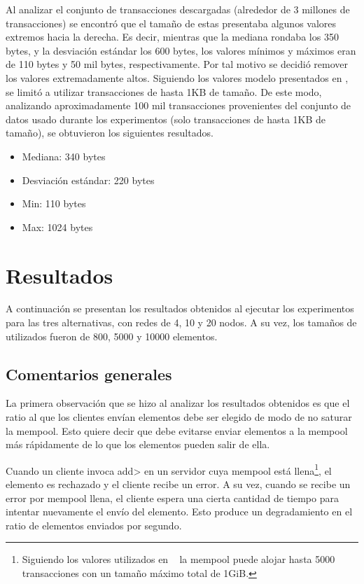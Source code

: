%
Al analizar el conjunto de transacciones descargadas (alrededor de 3 millones de transacciones) se encontró que el tamaño de
estas presentaba algunos valores extremos hacia la derecha.
Es decir, mientras que la mediana rondaba los 350 bytes, y la desviación estándar los 600 bytes, los valores mínimos y máximos eran de
110 bytes y  50 mil bytes, respectivamente.
Por tal motivo se decidió remover los valores extremadamente altos.
Siguiendo los valores modelo presentados en \cite{tendermint.design}, se limitó a utilizar transacciones de hasta 1KB de tamaño.
De este modo, analizando aproximadamente 100 mil transacciones provenientes del conjunto de datos usado
durante los experimentos (solo transacciones de hasta 1KB de tamaño), se obtuvieron los siguientes resultados.
\begin{itemize}
	\item Mediana: 340 bytes
	\item Desviación estándar: 220 bytes
	\item Min: 110 bytes
	\item Max: 1024 bytes
\end{itemize}

\section{Resultados}

A continuación se presentan los resultados obtenidos al ejecutar los experimentos para las tres alternativas,
con redes de 4, 10 y 20 nodos. A su vez, los tamaños de \collector utilizados fueron de
800, 5000 y 10000 elementos.

\subsection{Comentarios generales}

La primera observación que se hizo al analizar los resultados obtenidos es que el ratio al que los clientes envían elementos
debe ser elegido de modo de no saturar la mempool.
Esto quiere decir que debe evitarse enviar elementos a la mempool más rápidamente de lo que los elementos pueden salir de ella.

Cuando un cliente invoca \<add> en un servidor cuya mempool está llena\footnote{Siguiendo los valores utilizados en
~\cite{tendermint.design} la mempool puede alojar hasta 5000 transacciones con un tamaño máximo total de 1GiB.},
el elemento es rechazado y el cliente recibe un error.
A su vez, cuando se recibe un error por mempool llena, el cliente espera una cierta cantidad de tiempo para intentar
nuevamente el envío del elemento.
Esto produce un degradamiento en el ratio de elementos enviados por segundo.

